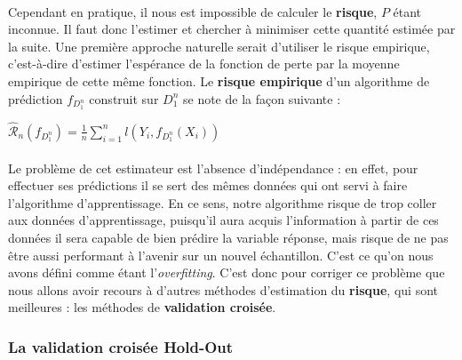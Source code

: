 \documentclass[14pt, openany]{article}
\begin{document}
\paragraph{}
Cependant en pratique, il nous est impossible de calculer le \textbf{risque}, $P$ étant inconnue. Il faut donc l'estimer et chercher à minimiser cette quantité estimée par la suite. Une première approche naturelle serait d'utiliser le risque empirique, c'est-à-dire d'estimer l'espérance de la fonction de perte par la moyenne empirique de cette même fonction. Le \textbf{risque empirique} d'un algorithme de prédiction $f_{D^{n}_{1}}$ construit sur $D^{n}_{1}$ se note de la façon suivante :
\begin{center}
$\widehat{\mathcal{R}}_n(f_{D^{n}_{1}}) = \frac{1}{n} \sum\limits_{i=1}^n l(Y_i,f_{D^{n}_{1}}(X_i))$
\end{center}

\paragraph{}
Le problème de cet estimateur est l'absence d'indépendance : en effet, pour effectuer ses prédictions il se sert des mêmes données qui ont servi à faire l'algorithme d'apprentissage. En ce sens, notre algorithme risque de trop \og coller \fg{} aux données d'apprentissage, puisqu'il aura acquis l'information à partir de ces données il sera capable de bien prédire la variable réponse, mais risque de ne pas être aussi performant à l'avenir sur un nouvel échantillon. C'est ce qu'on nous avons défini comme étant l'\textit{overfitting}. C'est donc pour corriger ce problème que nous allons avoir recours à d'autres méthodes d'estimation du \textbf{risque}, qui sont meilleures : les méthodes de \textbf{validation croisée}.

\subsubsection{La validation croisée Hold-Out}
\end{document}
